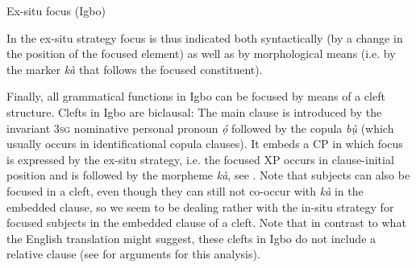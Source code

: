 \documentclass[output=paper,colorlinks,citecolor=brown]{langscibook}
\begin{document}
\enlargethispage{0.5\baselineskip}
\ea%
    \label{ex:amaechi:5}
    Ex-situ focus (Igbo)\\
    \z
\z

In the ex-situ strategy focus is thus indicated both syntactically (by a change in the position of the focused element) as well as by morphological means (i.e. by the marker \textit{k\`a} that follows the focused constituent).

Finally, all grammatical functions in Igbo can be focused by means of a cleft structure. Clefts in Igbo are biclausal: The main clause is introduced by the invariant \textsc{3sg} nominative personal pronoun \textit{ọ́} followed by the copula  \textit{bụ̀} (which usually occurs in identificational copula clauses). It embeds a CP in which focus is expressed by the ex-situ strategy, i.e. the focused XP occurs in clause-initial position and is followed by the morpheme \textit{k\`a}, see . Note that subjects can also be focused in a cleft, even though they can still not co-occur with \textit{k\`a} in the embedded clause, so we seem to be dealing rather with the in-situ strategy for focused subjects in the embedded clause of a cleft. Note that in contrast to what the English translation might suggest, these clefts in Igbo do not include a relative clause (see \citealt{Amaechi2018} for arguments for this analysis).
\end{document}
